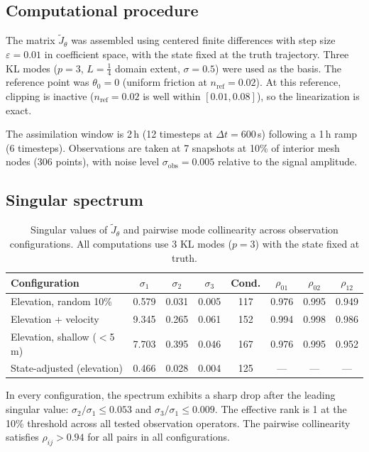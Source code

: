 \documentclass[11pt]{article}
\theoremstyle{definition}
\begin{document}
\subsection{Computational procedure}

The matrix $\widetilde{J}_\theta$ was assembled using centered finite
differences with step size $\varepsilon = 0.01$ in coefficient space,
with the state fixed at the truth trajectory.  Three KL modes
($p = 3$, $L = \frac{1}{4}$ domain extent, $\sigma = 0.5$) were
used as the basis.  The reference point was $\theta_0 = 0$ (uniform
friction at $n_{\mathrm{ref}} = 0.02$).  At this reference, clipping
is inactive ($n_{\mathrm{ref}} = 0.02$ is well within $[0.01, 0.08]$),
so the linearization is exact.

The assimilation window is 2\,h (12 timesteps at $\Delta t = 600\,$s)
following a 1\,h ramp (6 timesteps).  Observations are taken at 7
snapshots at 10\% of interior mesh nodes (306 points), with noise
level $\sigma_{\mathrm{obs}} = 0.005$ relative to the signal
amplitude.

\subsection{Singular spectrum}

\begin{table}[h]
\centering
\caption{Singular values of $\widetilde{J}_\theta$ and pairwise mode
collinearity across observation configurations.  All computations use
3 KL modes ($p=3$) with the state fixed at truth.}
\label{tab:spectrum}
\begin{tabular}{lccccccc}
\toprule
Configuration
  & $\sigma_1$ & $\sigma_2$ & $\sigma_3$
  & Cond.
  & $\rho_{01}$ & $\rho_{02}$ & $\rho_{12}$ \\
\midrule
Elevation, random 10\%
  & 0.579 & 0.031 & 0.005
  & 117
  & 0.976 & 0.995 & 0.949 \\
Elevation + velocity
  & 9.345 & 0.265 & 0.061
  & 152
  & 0.994 & 0.998 & 0.986 \\
Elevation, shallow ($<$5\,m)
  & 7.703 & 0.395 & 0.046
  & 167
  & 0.976 & 0.995 & 0.952 \\
State-adjusted (elevation)
  & 0.466 & 0.028 & 0.004
  & 125
  & --- & --- & --- \\
\bottomrule
\end{tabular}
\end{table}

In every configuration, the spectrum exhibits a sharp drop after the
leading singular value:
$\sigma_2/\sigma_1 \le 0.053$ and
$\sigma_3/\sigma_1 \le 0.009$.  The effective rank is 1 at the 10\%
threshold across all tested observation operators.  The pairwise
collinearity satisfies $\rho_{ij} > 0.94$ for all pairs in all
configurations.
\end{document}
